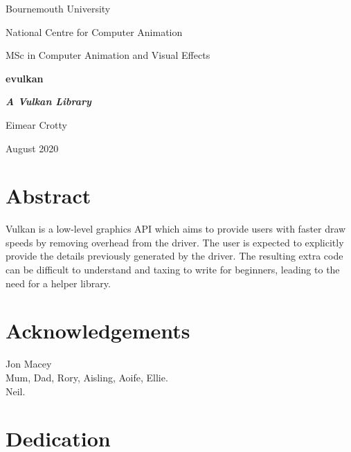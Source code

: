 \documentclass[12pt]{report}
\theoremstyle{definition}
\begin{document}
  \renewcommand{\familydefault}{\sfdefault}
  \selectfont

  \begin{titlepage}
    \centering
    {\Huge Bournemouth University\par}
    \vspace{0.5cm}
    {\Large National Centre for Computer Animation\par}
    \vspace{0.5cm}
    {\Large MSc in Computer Animation and Visual Effects\par}
    \vspace{5cm}
    {\huge \bfseries evulkan\par}
    \vspace{0.5cm}
    {\Large \bfseries \textit{A Vulkan Library}\par}
    \vspace{2cm}
    {\Large Eimear Crotty\par}
    \vfill
    {\Large August 2020}
  \end{titlepage}

  \chapter*{Abstract}
    Vulkan is a low-level graphics API which aims to provide users with faster
    draw speeds by removing overhead from the driver. The user is expected to
    explicitly provide the details previously generated by the driver. The
    resulting extra code can be difficult to understand and taxing to write
    for beginners, leading to the need for a helper library.

  \chapter*{Acknowledgements}

    \vspace{1cm}
    Jon Macey\\
    Mum, Dad, Rory, Aisling, Aoife, Ellie.\\
    Neil.

  \chapter*{Dedication}

\end{document}
